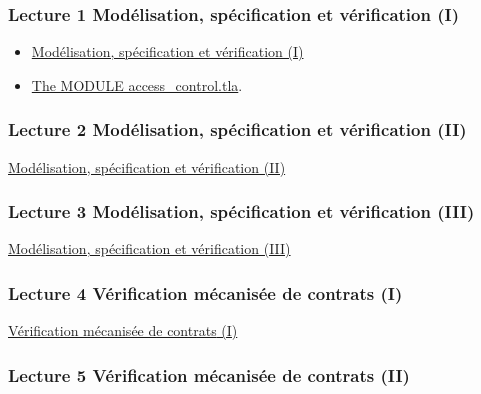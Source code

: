 \documentclass[ 12pt]{article}
\begin{document}
\subsubsection{Lecture 1 {Mod\'elisation, 
    sp\'ecification et v\'erification}  (I) }
  
\begin{itemize}
\item
  \href{http://mery54.github.io/teaching/movex/lecturesnotes/movexlecture1.pdf}{Mod\'elisation,
    sp\'ecification et v\'erification (I)}
\item
  \href{http://mery54.github.io/teaching/movex/tlafolder/access_control.tla}{The
    MODULE access\_control.tla}.  
 
\end{itemize}


  
\subsubsection{Lecture 2 {Mod\'elisation,      sp\'ecification et v\'erification} (II)}
  
  \href{http://mery54.github.io/teaching/movex/lecturesnotes/movexlecture2.pdf}{Mod\'elisation,     sp\'ecification et v\'erification (II)}


  \subsubsection{Lecture 3 {Mod\'elisation,      sp\'ecification et v\'erification} (III)}
  
  \href{http://mery54.github.io/teaching/movex/lecturesnotes/movexlecture3.pdf}{Mod\'elisation,     sp\'ecification et v\'erification (III)}


  
  \subsubsection{Lecture 4 {Vérification  mécanisée de contrats} (I)}
  
\href{http://mery54.github.io/teaching/movex/lecturesnotes/movexlecture4.pdf}{{Vérification  mécanisée de contrats} (I)}



  \subsubsection{Lecture 5 {Vérification  mécanisée de contrats} (II)}
  
\end{document}

